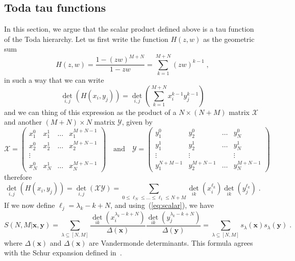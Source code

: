 \documentclass[a4paper,11pt]{amsart}
\begin{document}
\subsection{Toda tau functions}
In this section, we argue that the scalar product defined above is a tau function 
of the Toda hierarchy. Let us first write the function \(H(z,w)\) as the geometric sum 
\begin{equation}
  H(z,w) = \frac{1 - (zw)^{M+N}}{1 - zw} = \sum_{k=1}^{M+N} (zw)^{k-1} \; , 
\end{equation}
in such a way that 
we can write
\begin{equation}
  \det_{i,j} \left(H(x_i, y_j)\right) = \det_{i,j} \left( \sum_{k=1}^{M+N} x_i^{k-1} y_j^{k-1}\right)
\end{equation}
and we can thing of this expression as the product of a \(N\times (N+M)\) matrix \(\mathcal{X}\)
and another \((M + N)\times N\) matrix \(\mathcal{Y}\), given by
\begin{equation}
  \mathcal{X} = 
  \begin{pmatrix}
  x_1^0 & x_1^1 & \dots & x_1^{M+N-1} \\  
  x_2^0 & x_2^1 & \dots & x_2^{M+N-1} \\  
  \vdots \\
  x_N^0 & x_N^1 & \dots & x_N^{M+N-1} 
  \end{pmatrix}\quad \textrm{and} \quad 
  \mathcal{Y} = 
  \begin{pmatrix}
  y_1^0 & y_2^0 & \dots & y_N^0 \\  
  y_1^1 & y_2^1 & \dots & y_N^1 \\  
  \vdots & \vdots & & \vdots \\
  y_1^{N+M-1} & y_2^{M+N-1} & \dots & y_N^{M+N-1} 
  \end{pmatrix}
\end{equation}
therefore 
\begin{equation}
  \det_{i,j} \left(H(x_i, y_j)\right) =  \det_{i,j} \left( \mathcal{X}\mathcal{Y}\right)
= \sum_{0 \leq \ell_{N} \leq \dots \leq \ell_1\leq N+M }  \det_{ik}(x_i^{\ell_k})  \det_{ik}(y_j^{\ell_k})\; .
\end{equation}
If we now define \(\ell_j = \lambda_k - k + N\), and
using~(\ref{eq:scalar}), we have
\begin{equation}
\label{eq:scalar_exp}
S(N, M|\bm{x}, \bm{y}) = \sum_{\lambda\subseteq [N,M]}
\frac{\det_{ik}(x_i^{\lambda_k - k + N})}{\Delta(\bm{x})} \frac{ \det_{ik}(y_j^{\lambda_k - k + N})}{\Delta(\bm{y})}
= \sum_{\lambda\subseteq [N,M]} s_\lambda(\bm{x}) s_\lambda(\bm{y}) \; .
\end{equation}
where \(\Delta(\bm{x})\) and \(\Delta(\bm{x})\) are Vandermonde
determinants. This formula agrees with the Schur expansion defined
in~\cite{Bogoliubov2005}.
\end{document}
